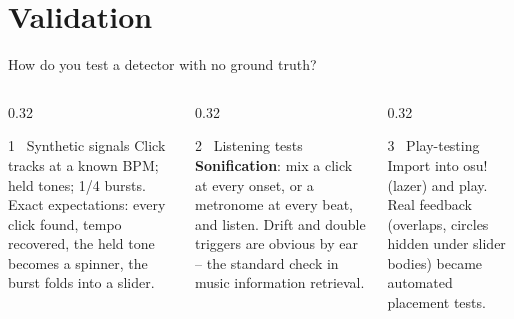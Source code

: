 \documentclass[aspectratio=169,11pt]{beamer}
\begin{document}
\section{Validation}
\begin{frame}{How do you test a detector with no ground truth?}
  \begin{columns}[T]
    \begin{column}{0.32\textwidth}
      \begin{block}{1 \ Synthetic signals}\small
        Click tracks at a known BPM; held tones; 1/4 bursts.
        Exact expectations: every click found, tempo recovered, the held tone becomes a
        spinner, the burst folds into a slider.
      \end{block}
    \end{column}
    \begin{column}{0.32\textwidth}
      \begin{block}{2 \ Listening tests}\small
        \textbf{Sonification}: mix a click at every onset, or a metronome at every beat,
        and listen. Drift and double triggers are obvious by ear -- the standard check in
        music information retrieval.
      \end{block}
    \end{column}
    \begin{column}{0.32\textwidth}
      \begin{block}{3 \ Play-testing}\small
        Import into osu!(lazer) and play. Real feedback (overlaps, circles hidden under
        slider bodies) became automated placement tests.
      \end{block}
    \end{column}
  \end{columns}
  \bigskip
  \begin{center}
  \end{center}
\end{frame}

\end{document}
